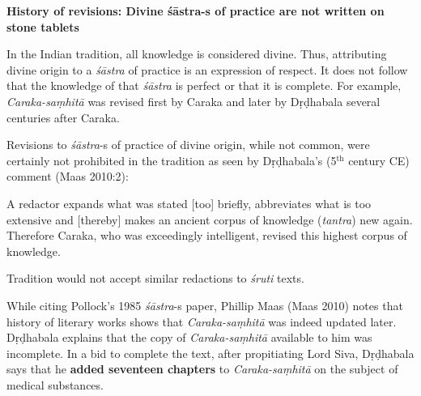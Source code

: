{\bf History of revisions: Divine śāstra-s of practice are not written on stone tablets}

In the Indian tradition, all knowledge is considered divine.  Thus, attributing divine origin to a {\sl śāstra} of practice is an expression of respect.  It does not follow that the knowledge of that {\sl śāstra} is perfect or that it is complete.  For example, {\sl Caraka-saṃhitā} was revised first by Caraka and later by Dṛḍhabala several centuries after Caraka.

Revisions to {\sl śāstra}-s of practice of divine origin, while not common, were certainly not prohibited in the tradition as seen by Dṛḍhabala's (5$^{\text{th}}$ century CE) comment (Maas 2010:2):
\begin{myquote}
A redactor expands what was stated [too] briefly, abbreviates what is too extensive and [thereby] makes an ancient corpus of knowledge ({\sl tantra}) new again. Therefore Caraka, who was exceedingly intelligent, revised this highest corpus of knowledge.
\end{myquote}

Tradition would not accept similar redactions to {\sl śruti} texts.

While citing Pollock's 1985 {\sl śāstra}-s paper, Phillip Maas (Maas 2010) notes that history of literary works shows that {\sl Caraka-saṃhitā} was indeed updated later.  Dṛḍhabala explains that the copy of {\sl Caraka-saṃhitā} available to him was incomplete.  In a bid to complete the text, after propitiating Lord Siva, Dṛḍhabala says that he {\bf added seventeen chapters} to {\sl Caraka-saṃhitā} on the subject of medical substances.

